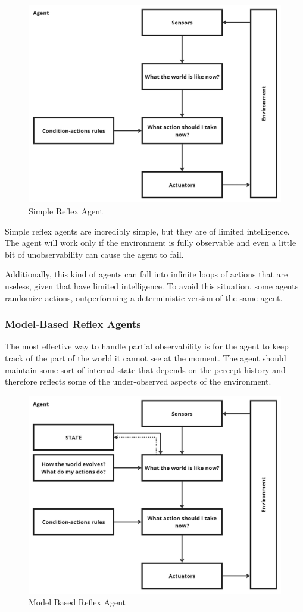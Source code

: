 \documentclass{article}
\begin{document}
\begin{figure}[h]
    \centering
    \includegraphics[width=0.75\linewidth]{images/Simple Reflex Agent.jpg}
    \caption{Simple Reflex Agent}
    \label{fig:simple_reflex_agent}
\end{figure}

Simple reflex agents are incredibly simple, but they are of limited intelligence. The agent will work only if the environment is fully observable and even a little bit of unobservability can cause the agent to fail.

Additionally, this kind of agents can fall into infinite loops of actions that are useless, given that have limited intelligence. To avoid this situation, some agents randomize actions, outperforming a deterministic version of the same agent. 

\subsubsection{Model-Based Reflex Agents}
The most effective way to handle partial observability is for the agent to keep track of the part of the world it cannot see at the moment. The agent should maintain some sort of internal state that depends on the percept history and therefore reflects some of the under-observed aspects of the environment.

\begin{figure}[h]
    \centering
    \includegraphics[width=0.75\linewidth]{images/Model Based Reflex Agent.jpg}
    \caption{Model Based Reflex Agent}
    \label{fig:model_based_reflex_agent}
\end{figure}
\end{document}

